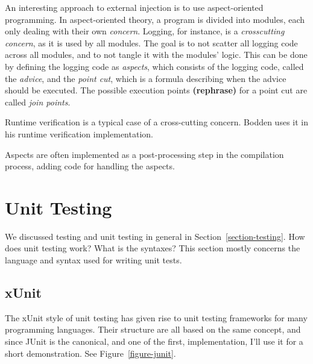 \documentclass[a4paper,11pt]{kth-mag}
\newcommand{\rephrase}{\textbf{(rephrase)} }
\begin{document}
An interesting approach to external injection is to use aspect-oriented
programming. In aspect-oriented theory, a program is divided into modules, each
only dealing with their own \textit{concern}. Logging, for instance, is a
\textit{crosscutting concern}, as it is used by all modules. The goal is to not
scatter all logging code across all modules, and to not tangle it with the
modules' logic. This can be done by defining the logging code as
\textit{aspects}, which consists of the logging code, called the
\textit{advice}, and the \textit{point cut}, which is a formula describing when
the advice should be executed. The possible execution points \rephrase for a
point cut are called \textit{join points}.

Runtime verification is a typical case of a cross-cutting concern. Bodden
\cite{bodden05efficientrv} uses it in his runtime verification implementation.

Aspects are often implemented as a post-processing step in the compilation
process, adding code for handling the aspects.


\section{Unit Testing} \label{section-unit-testing}

We discussed testing and unit testing in general in
Section~\ref{section-testing}. How does unit testing work? What is the
syntaxes? This section mostly concerns the language and syntax used for writing
unit tests.

\subsection{xUnit}

The xUnit style of unit testing \cite{fowlerxunit} has given rise to unit
testing frameworks for many programming languages. Their structure are all
based on the same concept, and since JUnit is the canonical, and one of the
first, implementation, I'll use it for a short demonstration. See
Figure~\ref{figure-junit}.
\end{document}
